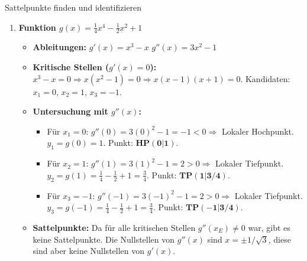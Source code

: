 \begin{loesungsumgebung}{Sattelpunkte finden und identifizieren}
\begin{enumerate}[label=(\alph*)]
    \item \textbf{Funktion $g(x) = \frac{1}{4}x^4 - \frac{1}{2}x^2 + 1$}
    \begin{itemize}
        \item \textbf{Ableitungen:}
        $g'(x) = x^3 - x$
        $g''(x) = 3x^2 - 1$
        \item \textbf{Kritische Stellen ($g'(x)=0$):}
        $x^3 - x = 0 \Rightarrow x(x^2-1) = 0 \Rightarrow x(x-1)(x+1) = 0$.
        Kandidaten: $x_1 = 0$, $x_2 = 1$, $x_3 = -1$.
        \item \textbf{Untersuchung mit $g''(x)$:}
        \begin{itemize}
            \item Für $x_1 = 0$: $g''(0) = 3(0)^2 - 1 = -1 < 0 \Rightarrow$ Lokaler Hochpunkt.
            $y_1 = g(0) = 1$. Punkt: $\mathbf{HP(0|1)}$.
            \item Für $x_2 = 1$: $g''(1) = 3(1)^2 - 1 = 2 > 0 \Rightarrow$ Lokaler Tiefpunkt.
            $y_2 = g(1) = \frac{1}{4} - \frac{1}{2} + 1 = \frac{3}{4}$. Punkt: $\mathbf{TP(1|3/4)}$.
            \item Für $x_3 = -1$: $g''(-1) = 3(-1)^2 - 1 = 2 > 0 \Rightarrow$ Lokaler Tiefpunkt.
            $y_3 = g(-1) = \frac{1}{4} - \frac{1}{2} + 1 = \frac{3}{4}$. Punkt: $\mathbf{TP(-1|3/4)}$.
        \end{itemize}
        \item \textbf{Sattelpunkte:} Da für alle kritischen Stellen $g''(x_E) \neq 0$ war, gibt es keine Sattelpunkte. Die Nullstellen von $g''(x)$ sind $x = \pm 1/\sqrt{3}$, diese sind aber keine Nullstellen von $g'(x)$.
    \end{itemize}


\end{enumerate}
\end{loesungsumgebung}
